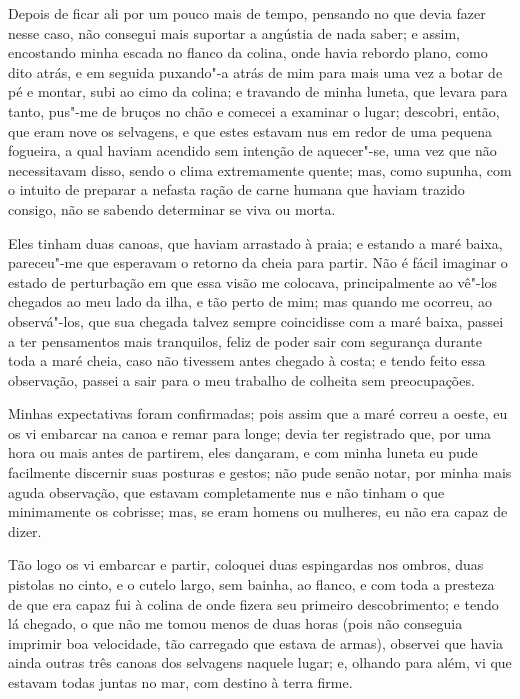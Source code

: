 Depois de ficar ali por um pouco mais de tempo, pensando no que devia
fazer nesse caso, não consegui mais suportar a angústia de nada saber; e
assim, encostando minha escada no flanco da colina, onde havia rebordo
plano, como dito atrás, e em seguida puxando"-a atrás de mim para mais
uma vez a botar de pé e montar, subi ao cimo da colina; e travando de
minha luneta, que levara para tanto, pus"-me de bruços no chão e comecei
a examinar o lugar; descobri, então, que eram nove os selvagens, e que
estes estavam nus em redor de uma pequena fogueira, a qual haviam
acendido sem intenção de aquecer"-se, uma vez que não necessitavam disso,
sendo o clima extremamente quente; mas, como supunha, com o intuito de
preparar a nefasta ração de carne humana que haviam trazido consigo, não
se sabendo determinar se viva ou morta.

Eles tinham duas canoas, que haviam arrastado à praia; e estando a maré
baixa, pareceu"-me que esperavam o retorno da cheia para partir. Não é
fácil imaginar o estado de perturbação em que essa visão me colocava,
principalmente ao vê"-los chegados ao meu lado da ilha, e tão perto de
mim; mas quando me ocorreu, ao observá"-los, que sua chegada talvez
sempre coincidisse com a maré baixa, passei a ter pensamentos mais
tranquilos, feliz de poder sair com segurança durante toda a maré cheia,
caso não tivessem antes chegado à costa; e tendo feito essa observação,
passei a sair para o meu trabalho de colheita sem preocupações.

Minhas expectativas foram confirmadas; pois assim que a maré correu a
oeste, eu os vi embarcar na canoa e remar para longe; devia ter
registrado que, por uma hora ou mais antes de partirem, eles dançaram, e
com minha luneta eu pude facilmente discernir suas posturas e gestos;
não pude senão notar, por minha mais aguda observação, que estavam
completamente nus e não tinham o que minimamente os cobrisse; mas, se
eram homens ou mulheres, eu não era capaz de dizer.

Tão logo os vi embarcar e partir, coloquei duas espingardas nos ombros,
duas pistolas no cinto, e o cutelo largo, sem bainha, ao flanco, e com
toda a presteza de que era capaz fui à colina de onde fizera seu
primeiro descobrimento; e tendo lá chegado, o que não me tomou menos de
duas horas (pois não conseguia imprimir boa velocidade, tão carregado
que estava de armas), observei que havia ainda outras três canoas dos
selvagens naquele lugar; e, olhando para além, vi que estavam todas
juntas no mar, com destino à terra firme.

